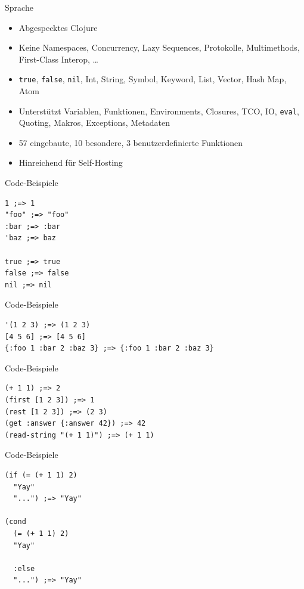 \documentclass[presentation]{beamer}
\begin{document}
\begin{frame}[fragile,label=sec-2-3]{Sprache}
 \begin{itemize}
\item Abgespecktes Clojure
\item Keine Namespaces, Concurrency, Lazy Sequences, Protokolle,
Multimethods, First-Class Interop, \ldots{}
\item \texttt{true}, \texttt{false}, \texttt{nil}, Int, String, Symbol, Keyword, List, Vector,
Hash Map, Atom
\item Unterstützt Variablen, Funktionen, Environments, Closures, TCO, IO,
\texttt{eval}, Quoting, Makros, Exceptions, Metadaten
\item 57 eingebaute, 10 besondere, 3 benutzerdefinierte Funktionen
\item Hinreichend für Self-Hosting
\end{itemize}
\end{frame}

\begin{frame}[fragile,label=sec-2-4]{Code-Beispiele}
 \begin{verbatim}
1 ;=> 1
"foo" ;=> "foo"
:bar ;=> :bar
'baz ;=> baz

true ;=> true
false ;=> false
nil ;=> nil
\end{verbatim}
\end{frame}

\begin{frame}[fragile,label=sec-2-5]{Code-Beispiele}
 \begin{verbatim}
'(1 2 3) ;=> (1 2 3)
[4 5 6] ;=> [4 5 6]
{:foo 1 :bar 2 :baz 3} ;=> {:foo 1 :bar 2 :baz 3}
\end{verbatim}
\end{frame}

\begin{frame}[fragile,label=sec-2-6]{Code-Beispiele}
 \begin{verbatim}
(+ 1 1) ;=> 2
(first [1 2 3]) ;=> 1
(rest [1 2 3]) ;=> (2 3)
(get :answer {:answer 42}) ;=> 42
(read-string "(+ 1 1)") ;=> (+ 1 1)
\end{verbatim}
\end{frame}

\begin{frame}[fragile,label=sec-2-7]{Code-Beispiele}
 \begin{verbatim}
(if (= (+ 1 1) 2)
  "Yay"
  "...") ;=> "Yay"

(cond
  (= (+ 1 1) 2)
  "Yay"

  :else
  "...") ;=> "Yay"
\end{verbatim}
\end{frame}
\end{document}
